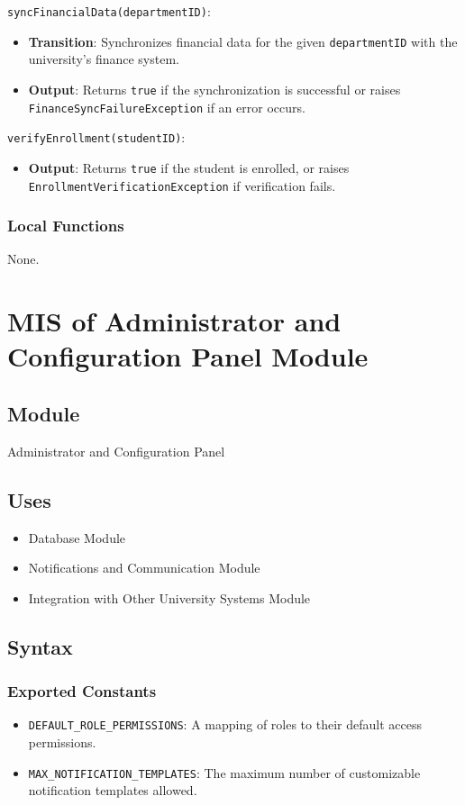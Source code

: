 \documentclass[12pt, titlepage]{article}
\begin{document}
\noindent \texttt{syncFinancialData(departmentID)}:
\begin{itemize}
    \item \textbf{Transition}: Synchronizes financial data for the given \texttt{departmentID} with the university’s finance system.
    \item \textbf{Output}: Returns \texttt{true} if the synchronization is successful or raises \texttt{FinanceSyncFailureException} if an error occurs.
\end{itemize}

\noindent \texttt{verifyEnrollment(studentID)}:
\begin{itemize}
    \item \textbf{Output}: Returns \texttt{true} if the student is enrolled, or raises \texttt{EnrollmentVerificationException} if verification fails.
\end{itemize}

\subsubsection{Local Functions}
None.

\section{MIS of Administrator and Configuration Panel Module}

\subsection{Module}
Administrator and Configuration Panel

\subsection{Uses}
\begin{itemize}
    \item Database Module
    \item Notifications and Communication Module
    \item Integration with Other University Systems Module
\end{itemize}

\subsection{Syntax}

\subsubsection{Exported Constants}
\begin{itemize}
    \item \texttt{DEFAULT\_ROLE\_PERMISSIONS}: A mapping of roles to their default access permissions.
    \item \texttt{MAX\_NOTIFICATION\_TEMPLATES}: The maximum number of customizable notification templates allowed.
\end{itemize}
\end{document}
